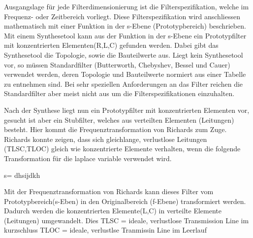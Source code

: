 
Ausgangslage für jede Filterdimensionierung ist die Filterspezifikation, welche im Frequenz- oder Zeitbereich vorliegt. Diese Filterspezifikation wird anschliessen mathematisch mit einer Funktion in der s-Ebene (Prototypbereich) beschrieben. Mit einem Synthesetool kann aus der Funktion in der s-Ebene ein Prototypfilter mit konzentrierten Elementen(R,L,C) gefunden werden. Dabei gibt das Synthesetool die Topologie, sowie die Bauteilwerte aus. Liegt kein Synthesetool vor, so müssen Standardfilter (Butterworth, Chebyshev, Bessel und Cauer) verwendet werden, deren Topologie und Bauteilwerte normiert aus einer Tabelle zu entnehmen sind. Bei sehr speziellen Anforderungen an das Filter reichen die Standardfilter aber meist nicht aus um die Filterspezifikationen einzuhalten.

Nach der Synthese liegt nun ein Prototypfilter mit konzentrierten Elementen vor, gesucht ist aber ein Stubfilter, welches aus verteilten Elementen (Leitungen) besteht. Hier kommt die Frequenztransformation von Richards zum Zuge. Richards konnte zeigen, dass sich gleichlange, verlustlose Leitungen (TLSC,TLOC) gleich wie konzentrierte Elemente verhalten, wenn die folgende Transformation für die laplace variable verwendet wird.

s= dhsijdkh

Mit der Frequenztransformation von Richards kann dieses Filter vom Prototypbereich(s-Eben) in den Originalbereich (f-Ebene) transformiert werden. Dadurch werden die konzentrierten Elemente(L,C) in verteilte Elemente (Leitungen) umgewandelt. Dies 
TLSC = ideale, verlustlose Transmission Line im kurzschluss
TLOC = ideale, verlustlse Tranmissin Line im Leerlauf



\newpage

